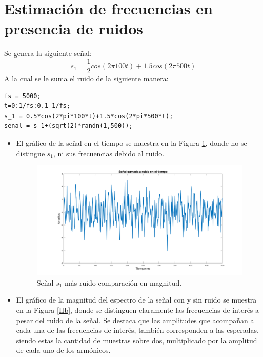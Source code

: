 \documentclass[letterpaper,onecolumn,10pt,journal,final]{IEEEtran}
\begin{document}
\section{Estimación de frecuencias en presencia de ruidos}
Se genera la siguiente señal:
\begin{equation}
    s_1 = \frac{1}{2} cos(2 \pi 100 t)+1.5 cos(2 \pi 500 t)
\end{equation}
A la cual se le suma el ruido de la siguiente manera:
\begin{lstlisting}
fs = 5000;
t=0:1/fs:0.1-1/fs;
s_1 = 0.5*cos(2*pi*100*t)+1.5*cos(2*pi*500*t);
senal = s_1+(sqrt(2)*randn(1,500));
\end{lstlisting}
\begin{itemize}
\item El gráfico de la señal en el tiempo se muestra en la Figura \ref{IIa}, donde no se distingue $s_1$, ni sus frecuencias debido al ruido.

\begin{figure}[H]
\centering
\includegraphics[width=1 \linewidth]{Figuras/IIa.png}
\caption{Señal $s_1$ más ruido comparación en magnitud.}
\label{IIa}
\end{figure}



\item El gráfico de la magnitud del espectro de la señal con y sin ruido se muestra en la Figura \ref{IIb}, donde se distinguen claramente las frecuencias de interés a pesar del ruido de la señal. Se destaca que las amplitudes que acompañan a cada una de las frecuencias de interés, también corresponden a las esperadas, siendo estas la cantidad de muestras sobre dos, multiplicado por la amplitud de cada uno de los armónicos.


\end{itemize}
\end{document}
